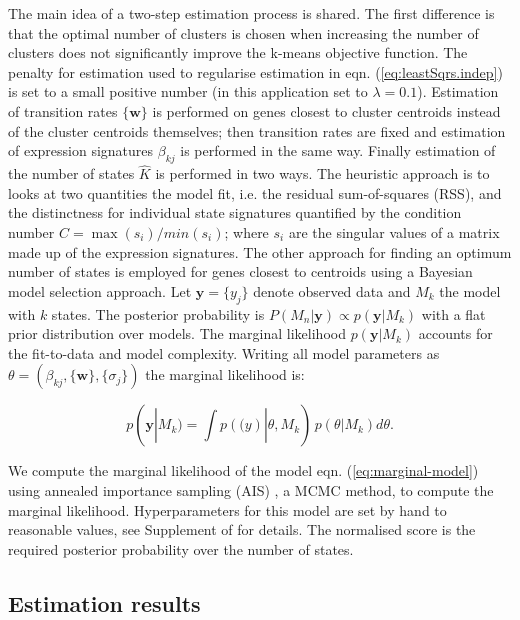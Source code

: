 The main idea of a two-step estimation process is shared. The first difference is that the optimal number of clusters is chosen when increasing the number of clusters does not significantly improve the k-means objective function. The penalty for estimation used to regularise estimation in eqn. (\ref{eq:leastSqrs.indep}) is set to a small positive number (in this application set to $ \lambda = 0.1 $). Estimation of transition rates $\lbrace \mathbf{w} \rbrace $ is performed on genes closest to cluster centroids instead of the cluster centroids themselves; then transition rates are fixed and estimation of expression signatures $\beta_{kj}$ is performed in the same way. Finally estimation of the number of states $\hat{K}$ is performed in two ways. The heuristic approach is to looks at two quantities the model fit, i.e. the residual sum-of-squares (RSS), and the distinctness for individual state signatures quantified by the condition number $C = \max(s_i) / min(s_i)$; where $s_i$ are the singular values of a matrix made up of the expression signatures. The other approach for finding an optimum number of states is employed for genes closest to centroids using a Bayesian model selection approach. Let $\mathbf{y} = \lbrace y_j \rbrace$ denote observed data and $M_k$ the model with $k$ states. The posterior probability is $P(M_n | \mathbf{y}) \propto p(\mathbf{y}|M_k) $ with a flat prior distribution over models. The marginal likelihood $p(\mathbf{y} | M_k)$ accounts for the fit-to-data and model complexity. Writing all model parameters as $\theta = (\beta_{kj}, \lbrace \mathbf{w} \rbrace, \lbrace \sigma_j \rbrace) $ the marginal likelihood is:

\begin{equation}
  \label{eq:marginal-model}
  p(\mathbf{y} | M_k) = \int p(\mathbf(y) | \theta, M_k)\, p(\theta | M_k) d\theta.
\end{equation}

We compute the marginal likelihood of the model eqn. (\ref{eq:marginal-model}) using annealed importance sampling (AIS) \citep{Neal:2001ed}, a MCMC method, to compute the marginal likelihood. Hyperparameters for this model are set by hand to reasonable values, see Supplement of \cite{Armond:2013} for details. The normalised score is the required posterior probability over the number of states. 

\subsection{Estimation results}
\label{sec:estimation-results}

